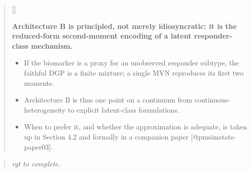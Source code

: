 \documentclass[
  11pt,
]{article}
\newcounter{pgraph}
\newenvironment{bullets}{%
  \stepcounter{pgraph}%
  \begin{quote}\small\sffamily\color[gray]{0.30}%
  {\normalfont\scriptsize\color[gray]{0.58}[\thepgraph]\enspace}}{%
  \end{quote}}
\newenvironment{rgt}{%
  \begin{quote}\small\itshape\color[RGB]{20,60,160}}{%
  \end{quote}}
\begin{document}
\begin{bullets}

\textbf{Architecture B is principled, not merely idiosyncratic: it
is the reduced-form second-moment encoding of a latent
responder-class mechanism.}

\begin{itemize}\setlength{\itemsep}{2pt}\setlength{\parskip}{0pt}
\item If the biomarker is a proxy for an unobserved responder
  subtype, the faithful DGP is a finite mixture; a single MVN
  reproduces its first two moments.
\item Architecture B is thus one point on a continuum from
  continuous-heterogeneity to explicit latent-class formulations.
\item When to prefer it, and whether the approximation is adequate,
  is taken up in Section 4.2 and formally in a companion paper
  [@pmsimstats-paper03].
\end{itemize}

\end{bullets}

\begin{rgt}
rgt to complete.

\end{rgt}
\end{document}
